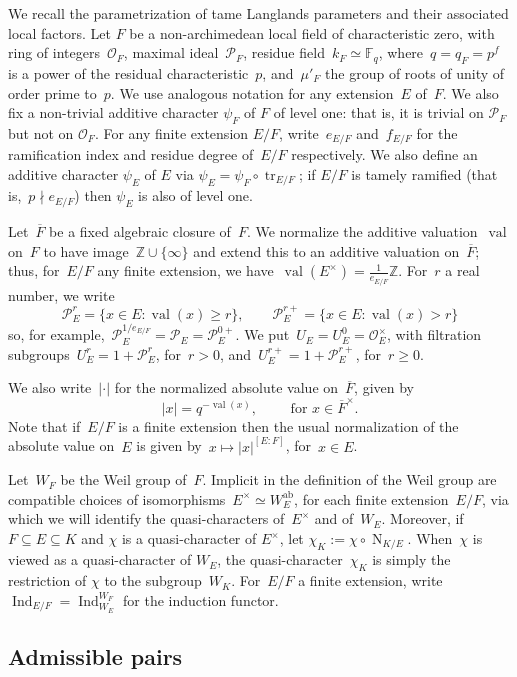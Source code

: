\documentclass[12pt]{amsart}
\newcommand{\BF}{\mathbb {F}}
\newcommand{\BZ}{\mathbb {Z}}
\newcommand{\CO}{\mathcal {O}}
\newcommand{\CP}{\mathcal {P}}
\newcommand{\Ind}{\operatorname{Ind}}
\newcommand{\N}{\operatorname{N}}
\newcommand{\tr}{\operatorname{tr}}
\newcommand{\val}{\operatorname{val}}
\begin{document}
We recall the parametrization of tame Langlands parameters and their associated local factors. Let $F$ be a non-archimedean local field of characteristic zero, with ring of integers~$\CO_F$, maximal ideal~$\CP_F$, residue field~$k_F\simeq\BF_q$, where~$q =q_F= p^f$ is a power of the residual characteristic~$p$, and~$\mu'_F$ the group of roots of unity of order prime to~$p$. We use analogous notation for any extension~$E$ of~$F$. We also fix a non-trivial additive character $\psi_F$ of $F$ of level one: that is, it is trivial on $\CP_F$ but not on $\CO_F$. For any finite extension $E/F$, write~$e_{E/F}$ and~$f_{E/F}$ for the ramification index and residue degree of~$E/F$ respectively. We also define an additive character $\psi_E$ of $E$ via $\psi_E=\psi_F \circ \tr_{E/F}$; if $E/F$ is tamely ramified (that is,~$p\nmid e_{E/F}$) then $\psi_E$ is also of level one.

Let~$\overline{F}$ be a fixed algebraic closure of~$F$. We normalize the additive valuation~$\val$ on~$F$ to have image~$\BZ\cup\{\infty\}$ and extend this to an additive valuation on~$\overline F$; thus, for~$E/F$ any finite extension, we have~$\val(E^\times)=\frac 1{e_{E/F}}\BZ$. For~$r$ a real number, we write
\[
\CP_E^r = \{x\in E : \val(x)\ge r\},\qquad
\CP_E^{r+} =  \{x\in E : \val(x) > r\}
\]
so, for example,~$\CP_E^{1/e_{E/F}}=\CP_E=\CP_E^{0+}$. We put~$U_E=U_E^0=\CO_E^\times$, with filtration subgroups~$U_E^r=1+\CP_E^r$, for~$r>0$, and~$U_E^{r+}=1+\CP_E^{r+}$, for~$r\ge 0$. 

We also write~$|\cdot|$ for the normalized absolute value on~$\overline{F}$, given by
\[
|x| = q^{-\val(x)}, \qquad\text{ for }x\in \overline{F}^\times.
\]
Note that if~$E/F$ is a finite extension then the usual normalization of the absolute value on~$E$ is given by~$x\mapsto |x|^{[E:F]}$, for~$x\in E$.

Let~$W_F$ be the Weil group of~$F$. Implicit in the definition of the Weil group are compatible choices of isomorphisms~$E^\times\simeq W_E^{\text{ab}}$, for each finite extension~$E/F$, via which we will identify the quasi-characters of~$E^\times$ and of~$W_E$. Moreover, if $F \subseteq E \subseteq K$ and $\chi$ is a quasi-character of $E^{\times}$, let $\chi_K:=\chi \circ \N_{K/E}$. When~$\chi$ is viewed as a quasi-character of $W_E$, the quasi-character~$\chi_K$ is simply the restriction of $\chi$ to the subgroup~$W_K$. For~$E/F$ a finite extension, write~$\Ind_{E/F}=\Ind_{W_E}^{W_F}$ for the induction functor.

\subsection{Admissible pairs}
\end{document}
